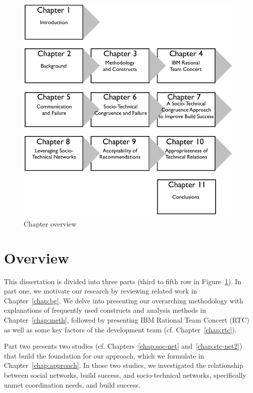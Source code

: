 \begin{figure}[t]
\centering
\includegraphics[width=.9\columnwidth]{figures/dis-over}
\caption{Chapter overview}
\label{fig:over}
\end{figure}

\section{Overview}
This dissertation is divided into three parts (third to fifth row in Figure~\ref{fig:over}).
In part one, we motivate our research by reviewing related work in Chapter~\ref{chap:bg}.
We delve into presenting our overarching methodology with explanations of frequently used constructs and analysis methods in Chapter~\ref{chap:meth}, followed by presenting IBM Rational Team Concert (RTC) as well as some key factors of the development team (cf. Chapter~\ref{chap:rtc}).

Part two presents two studies (cf. Chapters~\ref{chap:soc-net} and~\ref{chap:stc-net2}) that build the foundation for our approach, which we formulate in Chapter~\ref{chap:approach}.
In those two studies, we investigated the relationship between social networks, build success, and socio-technical networks, specifically unmet coordination needs, and build success.

